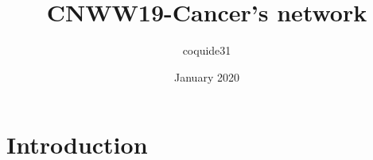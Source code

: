 \documentclass{article}
\title{CNWW19-Cancer's network}
\author{coquide31}
\date{January 2020}
\begin{document}
\maketitle

\section{Introduction}
\end{document}
